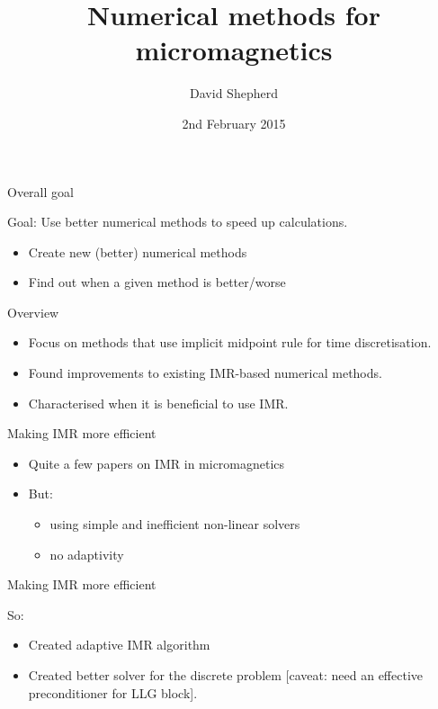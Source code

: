 \documentclass[18pt]{beamer}
\title{Numerical methods for micromagnetics}
\author[David Shepherd]{David Shepherd}
\institute[UoM]{The University of Manchester}
\date{2nd February 2015}
\newlength{\wideitemsep}
\let\olditem\item
\renewcommand{\item}{\setlength{\itemsep}{\wideitemsep}\olditem}
\begin{document}
\begin{frame}
  \titlepage
\end{frame}

\begin{frame}{Overall goal}
  \begin{center}
    {\huge Goal: Use better numerical methods to speed up calculations.}
  \end{center}

  \begin{itemize}
  \item Create new (better) numerical methods
  \item Find out when a given method is better/worse
  \end{itemize}
\end{frame}

\begin{frame}{Overview}
  \begin{itemize}
  \item Focus on methods that use implicit midpoint rule for time discretisation.
  \item Found improvements to existing IMR-based numerical methods.
  \item Characterised when it is beneficial to use IMR.
  \end{itemize}
\end{frame}


\begin{frame}{Making IMR more efficient}

  \begin{itemize}
  \item Quite a few papers on IMR in micromagnetics
  \item But:
    \begin{itemize}
    \item using simple and inefficient non-linear solvers
    \item no adaptivity
    \end{itemize}
  \end{itemize}
\end{frame}

\begin{frame}{Making IMR more efficient}

  So:
  \begin{itemize}
  \item Created adaptive IMR algorithm
  \item Created better solver for the discrete problem [caveat: need an
    effective preconditioner for LLG block].
  \end{itemize}

\end{frame}
\end{document}
